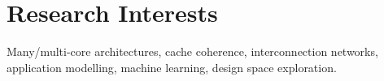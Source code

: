 \section{\sc Research Interests}
Many/multi-core architectures, cache coherence, interconnection networks, application modelling, machine learning, design space exploration.